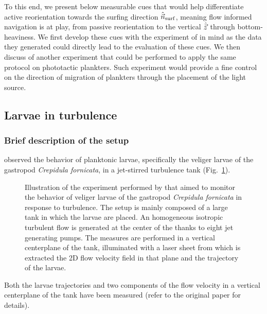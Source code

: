 To this end, we present below measurable cues that would help differentiate active reorientation towards the surfing direction $\hat{\vec{n}}_{\mathrm{surf}}$, meaning flow informed navigation is at play, from passive reorientation to the vertical $\hat{\vec{z}}$ through bottom-heaviness.
We first develop these cues with the experiment of \citet{dibenedetto2022responding} in mind as the data they generated could directly lead to the evaluation of these cues.
We then discuss of another experiment that could be performed to apply the same protocol on phototactic plankters.
Such experiment would provide a fine control on the direction of migration of plankters through the placement of the light source.

\subsection{Larvae in turbulence}

\subsubsection{Brief description of the setup}

\citet{dibenedetto2022responding} observed the behavior of planktonic larvae, specifically the veliger larvae of the gastropod \textit{Crepidula fornicata}, in a jet-stirred turbulence tank (Fig.~\ref{fig:tank}).
\begin{figure}%
	\centering
	\def\svgwidth{0.9\textwidth}
	
	\caption[Illustration of the experiment performed by \citet{dibenedetto2022responding}.]{
		Illustration of the experiment performed by \citet{dibenedetto2022responding} that aimed to monitor the behavior of veliger larvae of the gastropod \textit{Crepidula fornicata} in response to turbulence.
		The setup is mainly composed of a large tank in which the larvae are placed. 
		An homogeneous isotropic turbulent flow is generated at the center of the thanks to eight jet generating pumps.
		The measures are performed in a vertical centerplane of the tank, illuminated with a laser sheet from which is extracted the 2D flow velocity field in that plane and the trajectory of the larvae.
	}
	\label{fig:tank}
\end{figure}
Both the larvae trajectories and two components of the flow velocity in a vertical centerplane of the tank have been measured (refer to the original paper for details).

